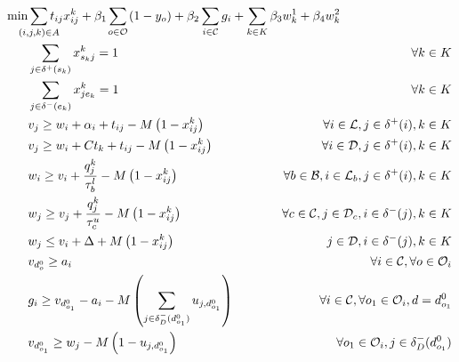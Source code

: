 \documentclass{article}
\begin{document}
\begin{alignat}{3}
\label{mod:obj}   \min &  \smashoperator{ \sum_{ \substack{(i,j,k) \in A} }} {t_{ij}x^{k}_{ij}} + \beta_1\smashoperator{\sum_{ o \in \mathcal{O}}}{  \left(1-y_o\right)} \hspace{-0mm}  + \beta_2 \smashoperator{ \sum_{i \in \mathcal{C} } } { g_i  } +  \sum_{k \in K}{\beta_3 w^{1}_k } + \beta_4 { w^{2}_k }&\\
    \label{mod:c1} &\sum_{j \in \delta^{+}(s_k) }{x^k_{s_kj}} = 1   &  \forall k \in K  \\
    \label{mod:c2} &\sum_{j \in \delta^{-}(e_k)}{x^k_{je_k}} = 1   &  \forall k \in K\\
    \label{mod:c3} & v_j \geq  w_i + \alpha_{i} + t_{ij} - M\left(1-x^{k}_{ij}\right)  & \hspace{-20mm} \forall i \in \mathcal{L}, j \in \delta^{+}(i),  k \in K \\
    \label{mod:c4}  & v_j \geq  w_i + Ct_{k} + t_{ij} - M\left(1-x^{k}_{ij}\right) & \hspace{-20mm} \forall i \in \mathcal{D}, j \in \delta^{+}(i), k \in K \\
    \label{mod:c5} & w_{i} \geq v_{i}  + \frac{q^k_j}{\tau^l_b} -M\left(1- x^{k}_{ij}\right) &  \hspace{-20mm} \forall  b \in \mathcal{B},  i \in \mathcal{L}_{b},  j \in \delta^{+}(i), k \in K \\
    \label{mod:c6} &          w_{j} \geq v_{j}  + {  \frac{q^k_j}{\tau^u_c} -M\left(1- x^{k}_{ij}\right) } & \hspace{-20mm}  \forall c \in  \mathcal{C}, j \in \mathcal{D}_{c}, i \in \delta^{-}(j),  k \in K \\
    \label{mod:c7} &         w_{j} \leq v_{i}  + \Delta + M\left(1- x^{k}_{ij}\right) & \hspace{-20mm}   j \in \mathcal{D},  i \in \delta^{-}(j),  k \in K \\
    \label{mod:c8}  &  v_{d^0_{o}} \geq a_i  & \hspace{-20mm} \forall  i \in \mathcal{C}, \forall o \in \mathcal{O}_i\\
    \label{mod:c9} & g_{i} \geq v_{d^0_{o_1}} - a_i - M\left(  \sum_{ j \in \delta^{-}_{D}(d^0_{o_1})  }{u_{j,d^0_{o_1}}}\right)  & \hspace{-20mm}  \forall  i \in \mathcal{C}, \forall o_1 \in \mathcal{O}_i, d=d^0_{o_1} \\
     \label{mod:c101} & v_{d^0_{o_1}} \geq w_j - M\left(1- u_{j,d^0_{o_1}}\right)  & \hspace{-40mm}    \forall o_1 \in \mathcal{O}_i,  j \in \delta_{D}^{-}(d^0_{o_1})  \\

\end{alignat}
\end{document}
